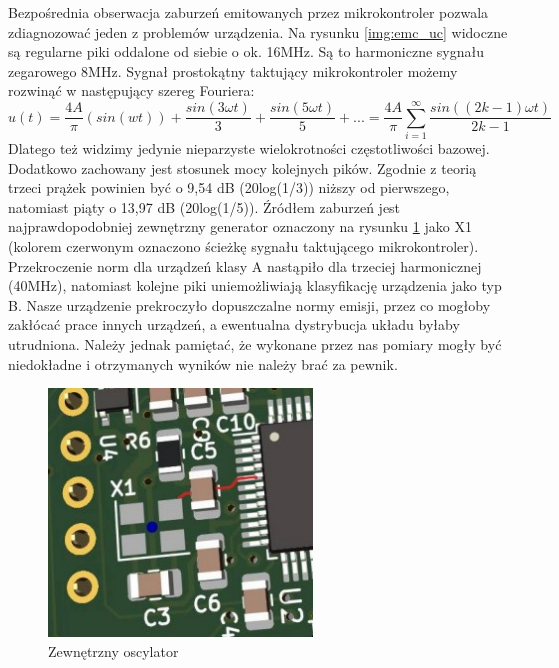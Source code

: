 Bezpośrednia obserwacja zaburzeń emitowanych przez mikrokontroler pozwala zdiagnozować jeden z problemów urządzenia. Na rysunku \ref{img:emc_uc} widoczne są regularne piki oddalone od siebie o ok. 16MHz. Są to harmoniczne sygnału zegarowego 8MHz.
\newline
Sygnał prostokątny taktujący mikrokontroler możemy rozwinąć w następujący szereg Fouriera: 
\begin{equation}
    u(t) = \frac{4A}{\pi} (sin(wt)) + \frac{sin(3\omega t)}{3} + \frac{sin(5\omega t)}{5} + ... = \frac{4A}{\pi} \sum \limits_{i=1}^{\infty} \frac{sin((2k - 1)\omega t)}{2k - 1}
\end{equation}
Dlatego też widzimy jedynie nieparzyste wielokrotności częstotliwości bazowej. Dodatkowo zachowany jest stosunek mocy kolejnych pików. Zgodnie z teorią trzeci prążek powinien być o 9,54 dB (20log(1/3)) niższy od pierwszego, natomiast piąty o 13,97 dB (20log(1/5)).
\newline
Źródłem zaburzeń jest najprawdopodobniej zewnętrzny generator oznaczony na rysunku \ref{img:emc_clock} jako X1 (kolorem czerwonym oznaczono ścieżkę sygnału taktującego mikrokontroler).
\newline
Przekroczenie norm dla urządzeń klasy A nastąpiło dla trzeciej harmonicznej (40MHz), natomiast kolejne piki uniemożliwiają klasyfikację urządzenia jako typ B. Nasze urządzenie prekroczyło dopuszczalne normy emisji, przez co mogłoby zakłócać prace innych urządzeń, a ewentualna dystrybucja układu byłaby utrudniona. Należy jednak pamiętać, że wykonane
przez nas pomiary mogły być niedokładne i otrzymanych wyników nie należy brać za pewnik. 

\begin{figure}[H]
    \centering
    \includegraphics[width=7cm]{Graphics/emc_clock.jpg}
    \caption{Zewnętrzny oscylator}
    \label{img:emc_clock}
\end{figure}

